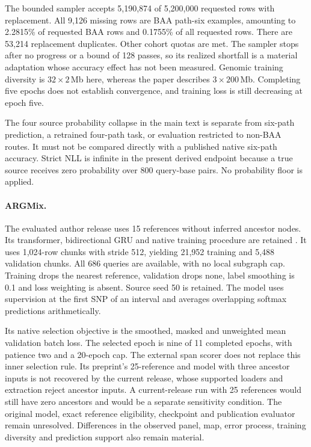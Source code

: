 \documentclass[letterpaper]{article}
\begin{document}
The bounded sampler accepts 5,190,874 of 5,200,000 requested rows with replacement. All 9,126 missing rows are BAA path-six examples, amounting to 2.2815\% of requested BAA rows and 0.1755\% of all requested rows. There are 53,214 replacement duplicates. Other cohort quotas are met. The sampler stops after no progress or a bound of 128 passes, so its realized shortfall is a material adaptation whose accuracy effect has not been measured. Genomic training diversity is $32\times2$\,Mb here, whereas the paper describes $3\times200$\,Mb. Completing five epochs does not establish convergence, and training loss is still decreasing at epoch five.

The four source probability collapse in the main text is separate from six-path prediction, a retrained four-path task, or evaluation restricted to non-BAA routes. It must not be compared directly with a published native six-path accuracy. Strict NLL is infinite in the present derived endpoint because a true source receives zero probability over 800 query-base pairs. No probability floor is applied.

\paragraph{ARGMix.}
The evaluated author release uses 15 references without inferred ancestor nodes. Its transformer, bidirectional GRU and native training procedure are retained \citep{ancientancestry2026}. It uses 1,024-row chunks with stride 512, yielding 21,952 training and 5,488 validation chunks. All 686 queries are available, with no local subgraph cap. Training drops the nearest reference, validation drops none, label smoothing is 0.1 and loss weighting is absent. Source seed 50 is retained. The model uses supervision at the first SNP of an interval and averages overlapping softmax predictions arithmetically.

Its native selection objective is the smoothed, masked and unweighted mean validation batch loss. The selected epoch is nine of 11 completed epochs, with patience two and a 20-epoch cap. The external span scorer does not replace this inner selection rule. Its preprint's 25-reference and model with three ancestor inputs is not recovered by the current release, whose supported loaders and extraction reject ancestor inputs. A current-release run with 25 references would still have zero ancestors and would be a separate sensitivity condition. The original model, exact reference eligibility, checkpoint and publication evaluator remain unresolved. Differences in the observed panel, map, error process, training diversity and prediction support also remain material.
\end{document}
